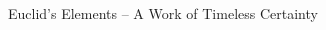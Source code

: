 \documentclass{beamer}
\begin{document}
\begin{frame}{Euclid's Elements -- A Work of Timeless Certainty}
{\begin{columns}[T,onlytextwidth]
\begin{column}{.33\textwidth}
{\begin{alertbox}
		\end{alertbox}
	  }
	 \end{column}
	 \begin{column}{.34\textwidth}
\end{column}
\end{columns}}
\end{frame}
\end{document}
